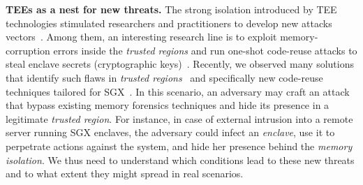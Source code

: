 \vspace{0.5cm}
\noindent \textbf{TEEs as a nest for new threats.}
%
%
The strong isolation introduced by TEE technologies stimulated researchers and 
practitioners to develop new attacks 
vectors~\citep{foreshadow,Murdock2019plundervolt,203183,lee2017hacking}.
Among them, an interesting research line is to exploit memory-corruption 
errors inside the \emph{trusted regions} and run one-shot code-reuse attacks to 
steal enclave secrets (\eg cryptographic keys)~\citep{shacham2007geometry}.
Recently, we observed many solutions that identify such flaws in \emph{trusted 
regions}~\citep{teerex,tale-two-worlds} and specifically new code-reuse 
techniques tailored for SGX~\citep{lee2017hacking,biondo2018guard}.
In this scenario, an adversary may craft an attack that bypass 
existing memory forensics techniques and hide its presence in a legitimate 
\emph{trusted region}.
%
For instance, in case of external intrusion into a remote server running SGX 
enclaves, the adversary could infect an \emph{enclave}, use it to 
perpetrate actions against the system, and hide her presence behind the 
\emph{memory isolation}.
We thus need to understand which conditions lead to these new threats and to 
what extent they might spread in real scenarios.

